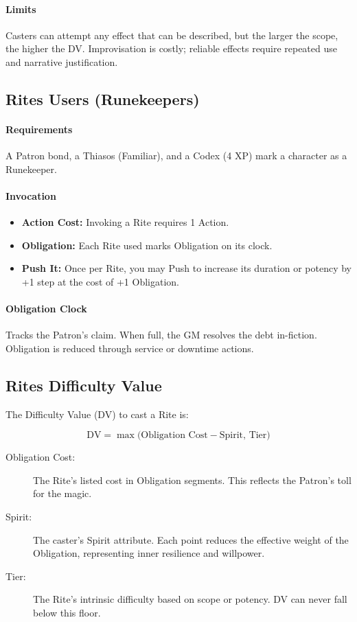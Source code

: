 \paragraph{Limits}
Casters can attempt any effect that can be described, but the larger the scope, the higher the DV. Improvisation is costly; reliable effects require repeated use and narrative justification.

\subsection{Rites Users (Runekeepers)}
\paragraph{Requirements}
A Patron bond, a Thiasos (Familiar), and a Codex (4 XP) mark a character as a Runekeeper. 

\paragraph{Invocation}
\begin{itemize}
  \item \textbf{Action Cost:} Invoking a Rite requires 1 Action. 
  \item \textbf{Obligation:} Each Rite used marks Obligation on its clock. 
  \item \textbf{Push It:} Once per Rite, you may Push to increase its duration or potency by +1 step at the cost of +1 Obligation.
\end{itemize}

\paragraph{Obligation Clock}
Tracks the Patron’s claim. When full, the GM resolves the debt in-fiction. Obligation is reduced through service or downtime actions.

\subsection{Rites Difficulty Value}
\label{sec:rites-dv-expanded}

The Difficulty Value (DV) to cast a Rite is:

\[
\text{DV} = \max\!\big(\text{Obligation Cost} - \text{Spirit}, \, \text{Tier}\big)
\]

\begin{description}
  \item[Obligation Cost:] The Rite’s listed cost in Obligation segments. This reflects the Patron’s toll for the magic.
  \item[Spirit:] The caster’s Spirit attribute. Each point reduces the effective weight of the Obligation, representing inner resilience and willpower.
  \item[Tier:] The Rite’s intrinsic difficulty based on scope or potency. DV can never fall below this floor.
\end{description}

